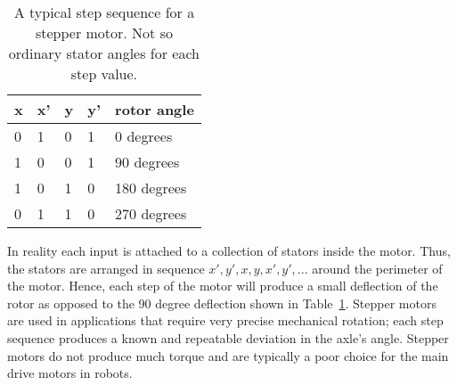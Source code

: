                             \begin{table}
                                \begin{tabular}{l|l|l|l||l}
                                    x    & x'    & y    & y'    & rotor angle \\ \hline
                                    0    & 1    & 0    & 1    & 0 degrees \\ \hline
                                    1    & 0    & 0    & 1    & 90 degrees \\ \hline
                                    1    & 0    & 1    & 0    & 180 degrees \\ \hline
                                    0    & 1    & 1    & 0    & 270 degrees \\
                                \end{tabular}
                                \label{table:stepper}
                                \caption{A typical step sequence for a stepper motor. Not so
                                ordinary stator angles for each step value.}
                            \end{table}

                            In reality each input is attached to a collection of stators inside the motor.
                            Thus, the stators are arranged in sequence
                            $x',y',x,y,x',y',...$ around the perimeter of the motor.  Hence,
                            each step of the motor will produce a small deflection of the
                            rotor as opposed to the 90 degree deflection shown in
                            Table~\ref{table:stepper}.  Stepper motors are used in applications
                            that require very precise mechanical rotation; each step sequence
                            produces a known and repeatable deviation in the axle's angle.
                            Stepper motors do not produce much torque and are typically a poor
                            choice for the main drive motors in robots.

